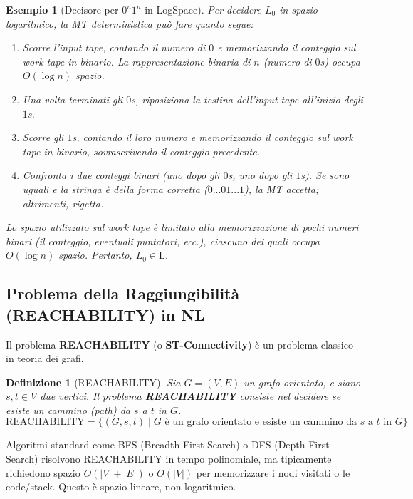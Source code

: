 \documentclass[a4paper]{article}
\newtheorem{definition}{Definizione}[section]
\newtheorem{example}{Esempio}[section]
\begin{document}
\begin{example}[Decisore per $0^n1^n$ in LogSpace]
Per decidere $L_0$ in spazio logaritmico, la MT deterministica può fare quanto segue:
\begin{enumerate}
    \item Scorre l'input tape, contando il numero di $0$ e memorizzando il conteggio sul work tape in binario. La rappresentazione binaria di $n$ (numero di $0$s) occupa $O(\log n)$ spazio.
    \item Una volta terminati gli $0$s, riposiziona la testina dell'input tape all'inizio degli $1$s.
    \item Scorre gli $1$s, contando il loro numero e memorizzando il conteggio sul work tape in binario, sovrascrivendo il conteggio precedente.
    \item Confronta i due conteggi binari (uno dopo gli $0$s, uno dopo gli $1$s). Se sono uguali e la stringa è della forma corretta ($0...01...1$), la MT accetta; altrimenti, rigetta.
\end{enumerate}
Lo spazio utilizzato sul work tape è limitato alla memorizzazione di pochi numeri binari (il conteggio, eventuali puntatori, ecc.), ciascuno dei quali occupa $O(\log n)$ spazio. Pertanto, $L_0 \in \text{L}$.
\end{example}

\subsection{Problema della Raggiungibilità (REACHABILITY) in NL}

Il problema \textbf{REACHABILITY} (o \textbf{ST-Connectivity}) è un problema classico in teoria dei grafi.

\begin{definition}[REACHABILITY]
Sia $G=(V,E)$ un grafo orientato, e siano $s, t \in V$ due vertici. Il problema \textbf{REACHABILITY} consiste nel decidere se esiste un cammino (path) da $s$ a $t$ in $G$.
\[ \text{REACHABILITY} = \{ (G, s, t) \mid G \text{ è un grafo orientato e esiste un cammino da } s \text{ a } t \text{ in } G \} \]
\end{definition}

Algoritmi standard come BFS (Breadth-First Search) o DFS (Depth-First Search) risolvono REACHABILITY in tempo polinomiale, ma tipicamente richiedono spazio $O(|V| + |E|)$ o $O(|V|)$ per memorizzare i nodi visitati o le code/stack. Questo è spazio lineare, non logaritmico.
\end{document}
